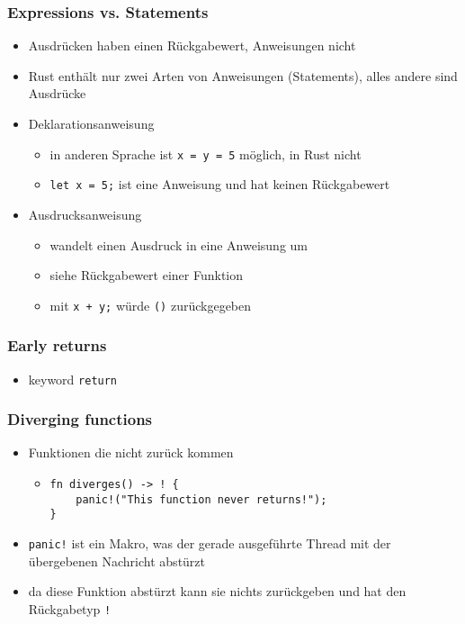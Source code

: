 \documentclass[a4paper,12pt]{article}
\begin{document}
\subsubsection*{Expressions vs. Statements}
	\begin{itemize}
	  \item Ausdrücken haben einen Rückgabewert, Anweisungen nicht
	  \item Rust enthält nur zwei Arten von Anweisungen (Statements), alles andere sind Ausdrücke
	  \item Deklarationsanweisung
	  \begin{itemize}
	    \item in anderen Sprache ist \verb|x = y = 5| möglich, in Rust nicht
	    \item \verb|let x = 5;| ist eine Anweisung und hat keinen Rückgabewert
	  \end{itemize}
	  \item Ausdrucksanweisung
	  \begin{itemize}
	    \item wandelt einen Ausdruck in eine Anweisung um
	    \item siehe Rückgabewert einer Funktion
	    \item mit \verb|x + y;| würde \verb|()| zurückgegeben
	  \end{itemize}
	\end{itemize}
\subsubsection*{Early returns}
	\begin{itemize}
	  \item keyword \verb|return|
	\end{itemize}
\subsubsection*{Diverging functions}
	\begin{itemize}
	  \item Funktionen die nicht zurück kommen
	  \begin{itemize}
	      \item[]
	      \begin{verbatim}
fn diverges() -> ! {
    panic!("This function never returns!");
}
	      \end{verbatim}
	  \end{itemize}
	  \item \verb|panic!| ist ein Makro, was der gerade ausgeführte Thread mit der übergebenen Nachricht abstürzt
	  \item da diese Funktion abstürzt kann sie nichts zurückgeben und hat den Rückgabetyp \verb|!|
	\end{itemize}
	
\end{document}
